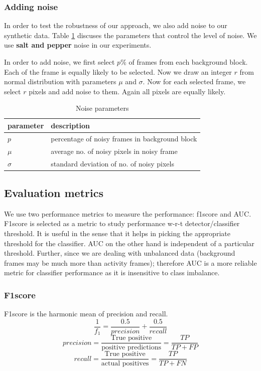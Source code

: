 \subsubsection{Adding noise}
In order to test the robustness of our approach, we also add noise to our synthetic data. Table \ref{table:noise-params} discuses the parameters that control the level of noise. We use \textbf{salt and pepper} noise in our experiments.

In order to add noise, we first select $p\%$ of frames from each background block. Each of the frame is equally likely to be selected. Now we draw an integer $r$ from normal distribution with parameters $\mu$ and $\sigma$. Now for each selected frame, we select $r$ pixels and add noise to them. Again all pixels are equally likely. 

\begin{table}
\centering
\caption{Noise parameters}  \vspace{5pt}
\label{table:noise-params}
\begin{tabular}{|l|l|}
\hline
parameter & description                              \\ \hline \hline
$p$         & percentage of noisy frames in background block  \\ 
$\mu$        & average no. of noisy pixels in noisy frame     \\ 
$\sigma$     & standard deviation of no. of noisy pixels     \\ \hline
\end{tabular}
\end{table}

\subsection{Evaluation metrics}
We use two performance metrics to measure the performance: f1score and AUC. F1score is selected as a metric to study performance w-r-t detector/classifier threshold. It is useful in the sense that it helps in picking the appropriate threshold for the classifier. AUC on the other hand is independent of a particular threshold. Further, since we are dealing with unbalanced data (background frames may be much more than activity frames); therefore AUC is a more reliable metric for classifier performance as it is insensitive to class imbalance.  
\subsubsection{F1score}
F1score is the harmonic mean of precision and recall. 
$$\frac{1}{f_1} = \frac{0.5}{precision} +  \frac{0.5}{recall} $$
$$precision = \frac{\text{True positive}}{\text{positive predictions}} =  \frac{TP}{TP + FP}$$
$$recall = \frac{\text{True positive}}{\text{actual positives}} =  \frac{TP}{TP + FN}$$

